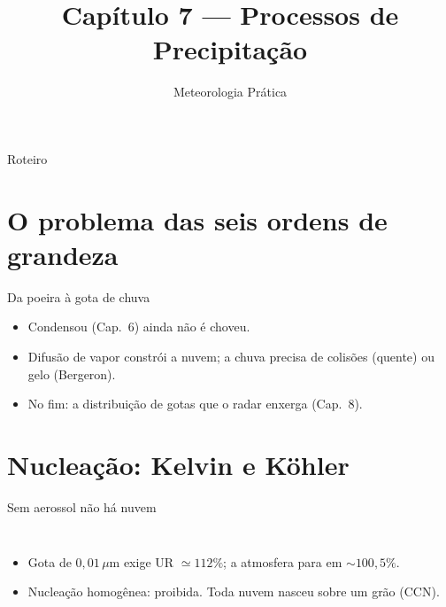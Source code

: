 \documentclass[aspectratio=169,11pt]{beamer}
\title[Cap. 7 --- Precipitação]{Capítulo 7 --- Processos de Precipitação}
\subtitle{Meteorologia Prática}
\author{}
\date{}
\begin{document}
\begin{frame}
  \titlepage
  \vfill
  \atribuicao
\end{frame}

\begin{frame}{Roteiro}
  \tableofcontents
\end{frame}

\section{O problema das seis ordens de grandeza}

\begin{frame}{Da poeira à gota de chuva}
  \vspace{0.5em}
  \begin{itemize}
    \item Condensou (Cap.~6) ainda não é choveu.
    \item Difusão de vapor constrói a \alert{nuvem}; a \alert{chuva}
          precisa de colisões (quente) ou gelo (Bergeron).
    \item No fim: a distribuição de gotas que o radar enxerga (Cap.~8).
  \end{itemize}
\end{frame}

\section{Nucleação: Kelvin e Köhler}

\begin{frame}{Sem aerossol não há nuvem}
  \begin{columns}
    \vspace{0.4em}
    \begin{itemize}
      \item Gota de $0{,}01\,\mu$m exige UR $\simeq112\%$; a atmosfera
            para em $\sim100{,}5\%$.
      \item Nucleação homogênea: proibida. Toda nuvem nasceu sobre um
            grão (CCN).
    \end{itemize}
  \end{columns}
\end{frame}
\end{document}
